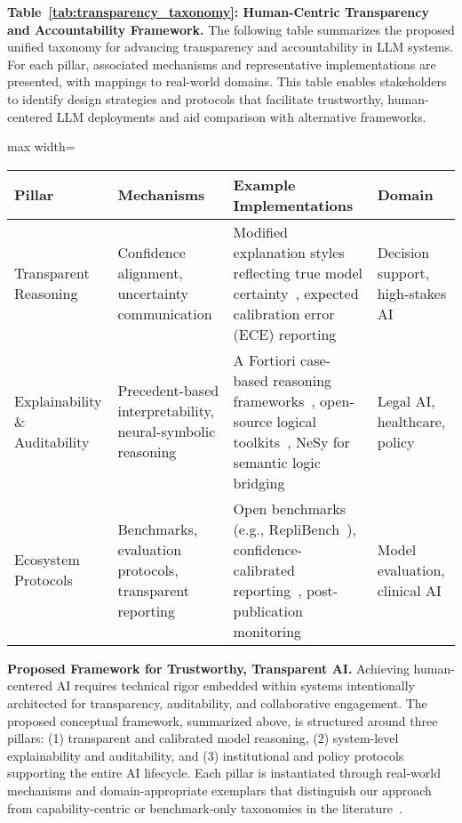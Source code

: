 \documentclass[sigconf]{acmart}
\begin{document}
\vspace{0.5em}
\noindent\textbf{Table~\ref{tab:transparency_taxonomy}: Human-Centric Transparency and Accountability Framework.} The following table summarizes the proposed unified taxonomy for advancing transparency and accountability in LLM systems. For each pillar, associated mechanisms and representative implementations are presented, with mappings to real-world domains. This table enables stakeholders to identify design strategies and protocols that facilitate trustworthy, human-centered LLM deployments and aid comparison with alternative frameworks.

\begin{table*}[htbp]
\centering
\caption{Taxonomy of Human-Centric Transparency and Accountability in LLM Systems}
\label{tab:transparency_taxonomy}
\begin{adjustbox}{max width=\textwidth}
\begin{tabular}{@{}llll@{}}
\toprule
Pillar & Mechanisms & Example Implementations & Domain \\ 
\midrule
Transparent Reasoning & Confidence alignment, uncertainty communication & Modified explanation styles reflecting true model certainty~\cite{ref35}, expected calibration error (ECE) reporting~\cite{ref35} & Decision support, high-stakes AI \\
Explainability \& Auditability & Precedent-based interpretability, neural-symbolic reasoning & A Fortiori case-based reasoning frameworks~\cite{ref46}, open-source logical toolkits~\cite{ref46}, NeSy for semantic logic bridging~\cite{ref44,ref52} & Legal AI, healthcare, policy \\
Ecosystem Protocols & Benchmarks, evaluation protocols, transparent reporting & Open benchmarks (e.g., RepliBench~\cite{ref23}), confidence-calibrated reporting~\cite{ref42}, post-publication monitoring~\cite{ref40,ref53} & Model evaluation, clinical AI \\
\bottomrule
\end{tabular}
\end{adjustbox}
\end{table*}

\vspace{0.5em}
\textbf{Proposed Framework for Trustworthy, Transparent AI.} Achieving human-centered AI requires technical rigor embedded within systems intentionally architected for transparency, auditability, and collaborative engagement. The proposed conceptual framework, summarized above, is structured around three pillars: (1) transparent and calibrated model reasoning, (2) system-level explainability and auditability, and (3) institutional and policy protocols supporting the entire AI lifecycle. Each pillar is instantiated through real-world mechanisms and domain-appropriate exemplars that distinguish our approach from capability-centric or benchmark-only taxonomies in the literature~\cite{ref42,ref55}.
\end{document}
